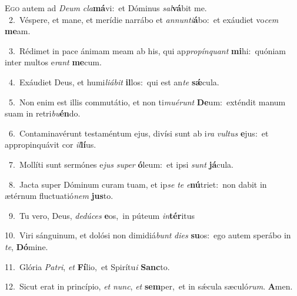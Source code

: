\lettrine{\initial\textcolor{\initialcolor}{E}}{go} autem ad \textit{De}\-\textit{um} \textit{cla}\-\textbf{má}vi:~\star et Dóminus \textit{sal}\-\textbf{vá}bit me.\\
{\numbfont\textcolor{\numbcolor}{~2.}}~Véspere, et mane, et merídie narrábo et \textit{an}\-\textit{nun}\textit{ti}\textbf{á}bo:~\star et exáudiet vo\textit{cem} \textbf{me}\-am.\par
{\numbfont\textcolor{\numbcolor}{~3.}}~Rédimet in pace ánimam meam ab his, qui ap\-\textit{pro}\-\textit{pín}\textit{quant} \textbf{mi}\-hi:~\star quóniam inter multos e\textit{rant} \textbf{me}\-cum.\par
{\numbfont\textcolor{\numbcolor}{~4.}}~Exáudiet Deus, et humi\-\textit{li}\-\textit{á}\textit{bit} \textbf{il}\-los:~\star qui est an\textit{te} \textbf{sǽ}\-cula.\par
{\numbfont\textcolor{\numbcolor}{~5.}}~Non enim est illis commutátio, et non ti\-\textit{mu}\-\textit{é}\textit{runt} \textbf{De}\-um:~\star exténdit manum suam in retri\-\textit{bu}\-\textbf{én}do.\par
{\numbfont\textcolor{\numbcolor}{~6.}}~Contaminavérunt testaméntum ejus, divísi sunt ab i\textit{ra} \textit{vul}\-\textit{tus} \textbf{e}\-jus:~\star et appropinquávit cor \textit{il}\-\textbf{lí}us.\par
{\numbfont\textcolor{\numbcolor}{~7.}}~Mollíti sunt sermónes e\textit{jus} \textit{su}\-\textit{per} \textbf{ó}\-leum:~\star et ipsi \textit{sunt} \textbf{já}\-cula.\par
{\numbfont\textcolor{\numbcolor}{~8.}}~Jacta super Dóminum curam tuam, et ip\textit{se} \textit{te} \textit{e}\-\textbf{nú}triet:~\star non dabit in ætérnum fluctuatió\textit{nem} \textbf{jus}\-to.\par
{\numbfont\textcolor{\numbcolor}{~9.}}~Tu vero, Deus, \textit{de}\-\textit{dú}\textit{ces} \textbf{e}\-os,~\star in púteum \textit{in}\-\textbf{tér}itus\par
{\numbfont\textcolor{\numbcolor}{10.}}~Viri sánguinum, et dolósi non dimidiá\textit{bunt} \textit{di}\-\textit{es} \textbf{su}\-os:~\star ego autem sperábo in \textit{te}\-, \textbf{Dó}\-mine.\par
{\numbfont\textcolor{\numbcolor}{11.}}~Glória \textit{Pa}\-\textit{tri}, \textit{et} \textbf{Fí}\-lio,~\star et Spirítu\textit{i} \textbf{Sanc}\-to.\par
{\numbfont\textcolor{\numbcolor}{12.}}~Sicut erat in princípio, \textit{et} \textit{nunc}\-, \textit{et} \textbf{sem}\-per,~\star et in sǽcula sæculó\-\textit{rum}\-. \textbf{A}\-men.\par
